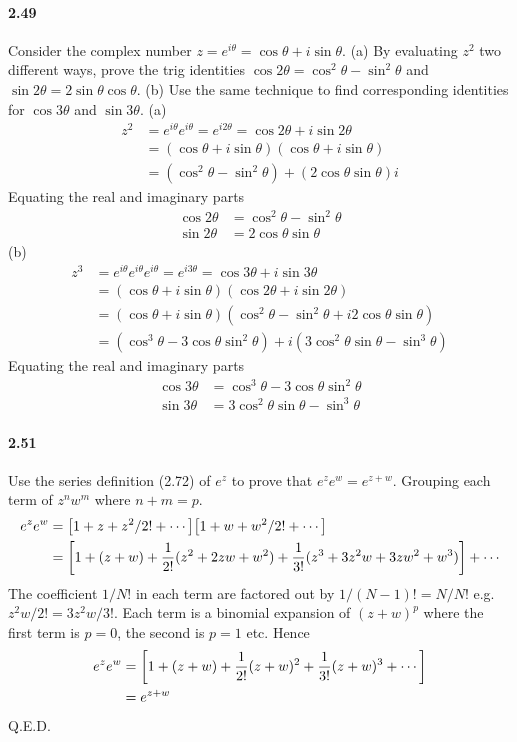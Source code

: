 \documentclass[../problems.tex]{subfiles}
\begin{document}
\paragraph{2.49} Consider the complex number $z=e^{i\theta}=\cos{\theta} + i\sin{\theta}$. (a) By
evaluating $z^2$ two different ways, prove the trig identities $\cos{2\theta}=\cos^2\theta - 
\sin^2\theta$ and $\sin{2\theta}=2\sin\theta\cos\theta$. (b) Use the same technique to find
corresponding identities for $\cos{3\theta}$ and $\sin{3\theta}$.
\barh 
(a) 
\begin{align*}
    z^2 &= e^{i\theta}e^{i\theta} = e^{i2\theta} = \cos{2\theta} + i\sin{2\theta} \\
    &= (\cos{\theta} + i\sin{\theta})(\cos{\theta} + i\sin{\theta}) \\
    &= (\cos^2\theta - \sin^2\theta) + (2\cos\theta\sin\theta) i
\end{align*}
Equating the real and imaginary parts
\begin{align*}
    \cos{2\theta} &= \cos^2\theta - \sin^2\theta \\
    \sin{2\theta} &= 2\cos\theta\sin\theta
\end{align*}
(b)
\begin{align*}
    z^3 &= e^{i\theta}e^{i\theta}e^{i\theta} = e^{i3\theta} = \cos{3\theta} + i\sin{3\theta} \\
    &= (\cos{\theta} + i\sin{\theta})(\cos{2\theta} + i\sin{2\theta}) \\
    &= (\cos{\theta} + i\sin{\theta})(\cos^2\theta - \sin^2\theta + i2\cos\theta\sin\theta) \\
    &= (\cos^3\theta - 3\cos\theta\sin^2\theta) + i(3\cos^2\theta\sin\theta - \sin^3\theta)
\end{align*}
Equating the real and imaginary parts
\begin{align*}
    \cos{3\theta} &= \cos^3\theta - 3\cos\theta\sin^2\theta \\
    \sin{3\theta} &= 3\cos^2\theta\sin\theta - \sin^3\theta
\end{align*}

\paragraph{2.51} Use the series definition (2.72) of $e^z$ to prove that $e^ze^w=e^{z+w}$.
\barh 
Grouping each term of $z^nw^m$ where $n + m = p$. 
\begin{align*}
    e^ze^w &= \quantity[1 + z + z^2/2! + \dotsm] \quantity[1 + w + w^2/2! + \dotsm] \\
    &= \quantity[1 + (z+w) + \frac{1}{2!}(z^2 + 2zw + w^2)
        + \frac{1}{3!}(z^3 + 3z^2w + 3zw^2 + w^3)] + \dotsm
\end{align*}
The coefficient $1/N!$ in each term are factored out by $1/(N-1)! = N/N!$ e.g. $z^2w/2! =3z^2w/3!$.
Each term is a binomial expansion of $(z+w)^p$ where the first term is $p=0$, the second is $p=1$
etc. Hence
\begin{align*}
    e^ze^w &= \quantity[1 + (z+w) + \frac{1}{2!}(z+w)^2 + \frac{1}{3!}(z+w)^3 + \dotsm] \\
    &= e^{z+w}
\end{align*}
Q.E.D.
\end{document}

